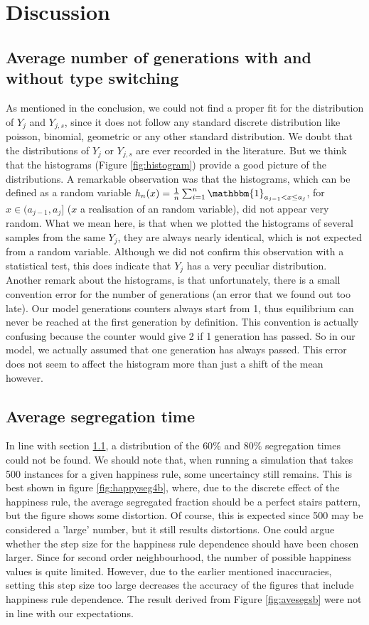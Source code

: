 \section{Discussion}
\subsection{Average number of generations with and without type switching}\label{subsec:discaveseg}
As mentioned in the conclusion, we could not find a proper fit for the distribution of $Y_{j}$ and $Y_{j,s}$, since it does not follow any standard discrete distribution like poisson, binomial, geometric or any other standard distribution. We doubt that the distributions of $Y_j$ or $Y_{j,s}$ are ever recorded in the literature. But we think that the histograms (Figure \ref{fig:histogram}) provide a good picture of the distributions. A remarkable observation was that the histograms, which can be defined as a random variable $h_n(x)=\frac{1}{n}\sum^n_{i=1}\mathbbm{1}_{a_{j-1}<x\leq a_j}$, for $x\in (a_{j-1},a_j]$ ($x$ a realisation of an random variable),  did not appear very random. What we mean here, is that when we plotted the histograms of several samples from the same $Y_j$, they are always nearly identical, which is not expected from a random variable. Although we did not confirm this observation with a statistical test, this does indicate that $Y_j$ has a very peculiar distribution.\\

Another remark about the histograms, is that unfortunately, there is a small convention error for the number of generations (an error that we found out too late). Our model generations counters always start from 1, thus equilibrium can never be reached at the first generation by definition. This convention is actually confusing because the counter would give 2 if 1 generation has passed. So in our model, we actually assumed that one generation has always passed. This error does not seem to affect the histogram more than just a shift of the mean however.

\subsection{Average segregation time}
In line with section \ref{subsec:discaveseg}, a distribution of the $60\%$ and $80\%$ segregation times could not be found. We should note that, when running a simulation that takes 500 instances for a given happiness rule, some uncertaincy still remains. This is best shown in figure \ref{fig:happyseg4b}, where, due to the discrete effect of the happiness rule, the average segregated fraction should be a perfect stairs pattern, but the figure shows some distortion. Of course, this is expected since 500 may be considered a 'large' number, but it still results distortions. One could argue whether the step size for the happiness rule dependence should have been chosen larger. Since for second order neighbourhood, the number of possible happiness values is quite limited. However, due to the earlier mentioned inaccuracies, setting this step size too large decreases the accuracy of the figures that include happiness rule dependence.
The result derived from Figure  \ref{fig:avesegsb} were not in line with our expectations.

